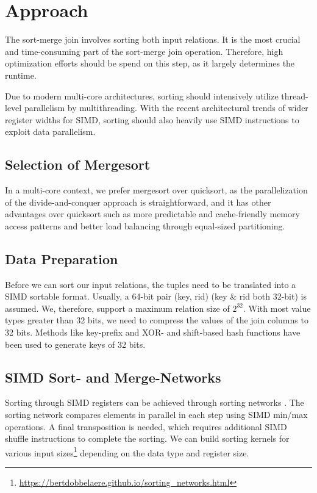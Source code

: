 \section{Approach}
\label{sec:approach}


The sort-merge join involves sorting both input relations. It is the most crucial and 
time-consuming part of the sort-merge join operation. Therefore, high optimization efforts should
be spend on this step, as it largely determines the runtime. 

Due to modern multi-core 
architectures, sorting should intensively utilize thread-level parallelism by multithreading.
With the recent architectural trends of wider register widths for SIMD, sorting should also
heavily use SIMD instructions to exploit data parallelism. 

\subsection{Selection of Mergesort}
In a multi-core context, we prefer mergesort over quicksort, as the parallelization of the divide-and-conquer approach
is straightforward, and it has other advantages over quicksort such as more predictable and 
cache-friendly memory access patterns and better load balancing through equal-sized partitioning. 

\subsection{Data Preparation}
Before we can sort our input relations, the tuples need to be translated into a SIMD sortable
format. Usually, a 64-bit pair (key, rid) (key \& rid both 32-bit) is assumed. We, therefore,
support a maximum relation size of $2^{32}$. With most value types greater
than 32 bits, we need to compress the values of the join columns to 32 bits. Methods like 
key-prefix \cite{chris_nyberg__1994} and XOR- and shift-based hash functions \cite{1319989} have 
been used to generate keys of 32 bits.

\subsection{SIMD Sort- and Merge-Networks}

Sorting through SIMD registers can be achieved through sorting networks \cite{10.1145/1468075.1468121}.
The sorting network compares elements in parallel in each step using SIMD min/max operations. 
A final transposition is needed, which requires additional SIMD shuffle instructions to complete
the sorting. We can build
sorting kernels for various input sizes\footnote{\url{https://bertdobbelaere.github.io/sorting_networks.html}} depending on the data type and register size. 

